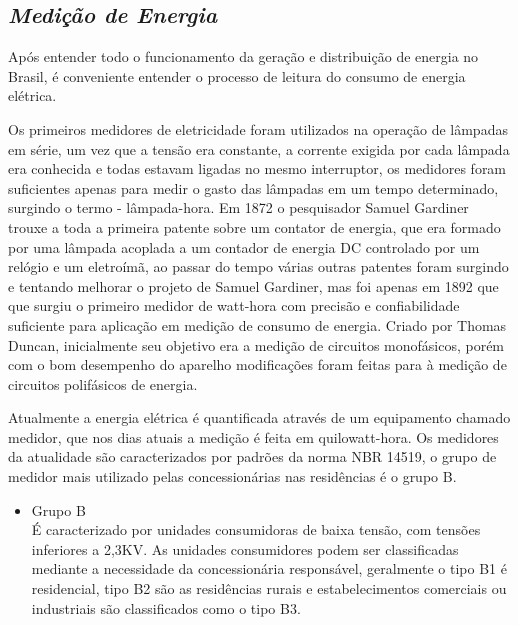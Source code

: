 \addtocounter{footnote}{-1}
\addtocounter{footnote}{1}

\subsection[\textit{Medição de Energia}]{\textit{Medição de Energia}}\label{med-energia}

Após entender todo o funcionamento da geração e distribuição de energia no Brasil, é conveniente entender o processo de leitura do consumo de 
energia elétrica.

Os primeiros medidores de eletricidade foram utilizados na operação de lâmpadas em série, um vez que a tensão era constante, a corrente exigida
por cada lâmpada era conhecida e todas estavam ligadas no mesmo interruptor, os medidores foram suficientes apenas para medir o gasto das lâmpadas
em um tempo determinado, surgindo o termo - lâmpada-hora. Em 1872 o pesquisador Samuel Gardiner trouxe a toda a primeira patente sobre um contator 
de energia, que era formado por uma lâmpada acoplada a um contador de energia DC controlado por um relógio e um eletroímã, ao passar do tempo várias
outras patentes foram surgindo e tentando melhorar o projeto de Samuel Gardiner, mas foi apenas em 1892 que que surgiu o primeiro medidor de watt-hora
com precisão e confiabilidade suficiente para aplicação em medição de consumo de energia. Criado por Thomas Duncan, inicialmente seu objetivo era a medição
de circuitos monofásicos, porém com o bom desempenho do aparelho modificações foram feitas para à medição de circuitos polifásicos de energia.

Atualmente a energia elétrica é quantificada através de um equipamento chamado medidor, que nos dias atuais a medição é feita em quilowatt-hora.
Os medidores da atualidade são caracterizados por padrões da norma NBR 14519, o grupo de medidor mais utilizado pelas concessionárias nas residências
é o grupo B. 

\begin{itemize}
	\item Grupo B \\
	É caracterizado por unidades consumidoras de baixa tensão, com tensões inferiores a 2,3KV. As unidades consumidores podem ser classificadas
	mediante a necessidade da concessionária responsável, geralmente o tipo B1 é residencial, tipo B2 são as residências rurais e estabelecimentos
	comerciais ou industriais são classificados como o tipo B3.
\end{itemize}

